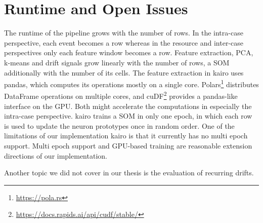 \section{Runtime and Open Issues}
\label{sec:discussion:runtime}
The runtime of the pipeline grows with the number of rows. In the intra-case perspective, each event becomes a row whereas in the resource and inter-case perspectives only each feature window becomes a row. Feature extraction, PCA, k-means and drift signals grow linearly with the number of rows, a SOM additionally with the number of its cells. The feature extraction in kairo uses pandas, which computes its operations mostly on a single core. Polars\footnote{\url{https://pola.rs}} distributes DataFrame operations on multiple cores, and cuDF\footnote{\url{https://docs.rapids.ai/api/cudf/stable/}} provides a pandas-like interface on the GPU. Both might accelerate the computations in especially the intra-case perspective. kairo trains a SOM in only one epoch, in which each row is used to update the neuron prototypes once in random order. One of the limitations of our implementation kairo is that it currently has no multi epoch support. Multi epoch support and GPU-based training are reasonable extension directions of our implementation.

Another topic we did not cover in our thesis is the evaluation of recurring drifts.
